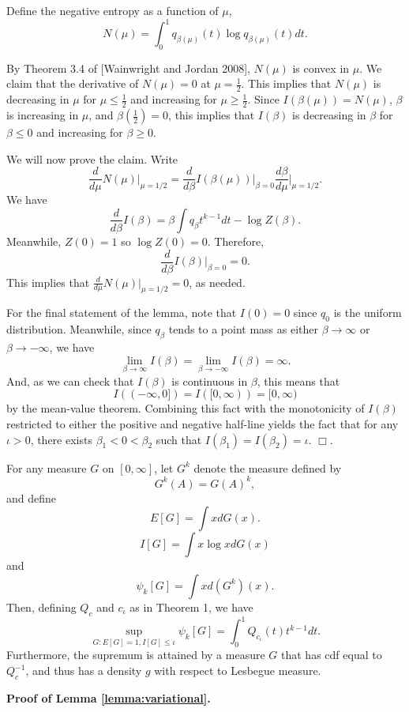 Define the negative entropy as a function of $\mu$,
\[
N(\mu) = \int_0^1 q_{\beta(\mu)}(t) \log q_{\beta(\mu)}(t) dt.
\]

By Theorem 3.4 of [Wainwright and Jordan 2008], $N(\mu)$ is convex in
$\mu$.  We claim that the derivative of $N(\mu) = 0$ at $\mu
= \frac{1}{2}$.  This implies that $N(\mu)$ is decreasing in $\mu$ for
$\mu \leq \frac{1}{2}$ and increasing for $\mu \geq \frac{1}{2}$.
Since $I(\beta(\mu)) = N(\mu)$, $\beta$ is increasing in $\mu$, and
$\beta(\frac{1}{2}) = 0$, this implies that $I(\beta)$ is decreasing
in $\beta$ for $\beta \leq 0$ and increasing for $\beta \geq 0$.

We will now prove the claim.  Write
\[
\frac{d}{d\mu} N(\mu)\bigg|_{\mu = 1/2} = \frac{d}{d\beta} I(\beta(\mu)) \bigg|_{\beta = 0} \frac{d\beta}{d\mu} \bigg|_{\mu = 1/2}.
\]
We have
\[
\frac{d}{d\beta} I(\beta) = \beta \int q_\beta t^{k-1} dt - \log Z(\beta).
\]
Meanwhile, $Z(0) = 1$ so $\log Z(0) = 0$.  Therefore,
\[
\frac{d}{d\beta} I(\beta) \bigg|_{\beta = 0} = 0.
\]
This implies that $\frac{d}{d\mu} N(\mu) |_{\mu = 1/2} = 0$, as needed.  

For the final statement of the lemma, note that $I(0) = 0$ since $q_0$ is the uniform distribution.
Meanwhile, since $q_\beta$ tends to a point mass as either $\beta \to \infty$ or $\beta \to -\infty$,
we have 
\[
\lim_{\beta \to \infty} I(\beta) = \lim_{\beta \to -\infty} I(\beta) = \infty.
\]
And, as we can check that $I(\beta)$ is continuous in $\beta$, this means that
\[
I((-\infty, 0]) = I([0,\infty)) = [0, \infty)
\]
by the mean-value theorem.  Combining this fact with the monotonicity
of $I(\beta)$ restricted to either the positive and negative half-line
yields the fact that for any $\iota > 0$, there exists $\beta_1 < 0
< \beta_2$ such that $I(\beta_1) = I(\beta_2) = \iota$.  $\Box$.

\begin{lemma}\label{lemma:variational}
For any measure $G$ on $[0, \infty]$,
let $G^k$ denote the measure defined by
\[
G^k(A) = G(A)^k,
\]
and define
\[
E[G] = \int x dG(x).
\]
\[
I[G] = \int x \log x dG(x)
\]
and
\[
\psi_k[G] = \int x d(G^k)(x).
\]
Then, defining $Q_c$ and $c_\iota$ as in Theorem 1, we have
\[
\sup_{G: E[G] = 1, I[G] \leq \iota} \psi_k[G] = \int_0^1 Q_{c_\iota}(t) t^{k-1} dt.
\]
Furthermore, the supremum is attained by a measure $G$ that has cdf
equal to $Q_c^{-1}$, and thus has a density $g$ with respect to
Lesbegue measure.
\end{lemma}

\textbf{Proof of Lemma \ref{lemma:variational}.} 

